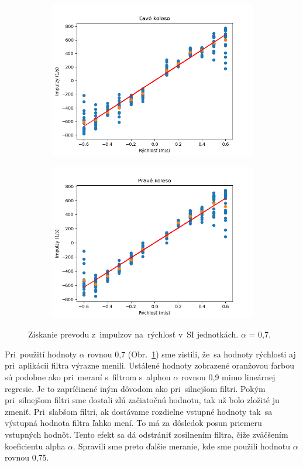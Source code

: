 \begin{figure}[!htbp]
	\begin{subfigure}{0.5\textwidth}
		\includegraphics[width=\textwidth]{img/lw_07250.png}
	\end{subfigure}
	\hfill
	\begin{subfigure}{0.5\textwidth}
		\includegraphics[width=\textwidth]{img/rw_07250.png}
	\end{subfigure}
	\caption{Získanie prevodu z~impulzov na~rýchlosť v~SI jednotkách. $\alpha$ = 0,7.}
	\label{fig:rw_lw_07250}
\end{figure}

Pri~použití hodnoty $\alpha$ rovnou 0,7 (Obr.~\ref{fig:rw_lw_07250}) sme zistili, že~sa hodnoty rýchlosti aj pri~aplikácii filtra výrazne menili. Ustálené
hodnoty zobrazené oranžovou farbou sú podobne ako pri~meraní s~filtrom s~alphou $\alpha$ rovnou 0,9 mimo lineárnej regresie.
Je to zapríčinené iným dôvodom ako pri~silnejšom filtri. Pokým pri~silnejšom filtri sme dostali zlú začiatočnú hodnotu, tak
už bolo zložité ju zmeniť. Pri~slabšom filtri, ak dostávame rozdielne vstupné hodnoty tak~sa výstupná hodnota filtra ľahko
mení. To má za dôsledok posun priemeru vstupných hodnôt. Tento efekt sa dá odstrániť zosilnením filtra, čiže zväčšením
koeficientu alpha $\alpha$. Spravili sme preto ďalšie meranie, kde sme použili hodnotu $\alpha$ rovnou 0,75.

